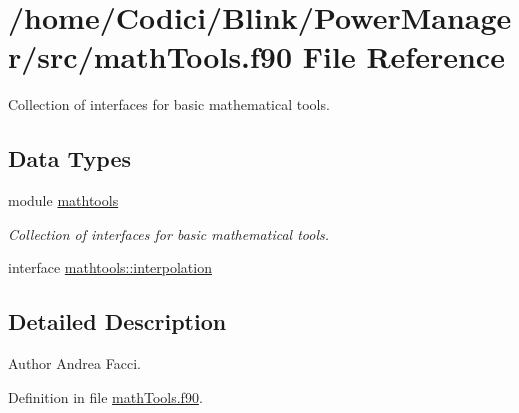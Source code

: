 \hypertarget{math_tools_8f90}{\section{/home/\-Codici/\-Blink/\-Power\-Manager/src/math\-Tools.f90 File Reference}
\label{math_tools_8f90}
}


Collection of interfaces for basic mathematical tools.  


\subsection*{Data Types}
\begin{DoxyCompactItemize}
\item 
module \hyperlink{classmathtools}{mathtools}
\begin{DoxyCompactList}\small\item\em Collection of interfaces for basic mathematical tools. \end{DoxyCompactList}\item 
interface \hyperlink{interfacemathtools_1_1interpolation}{mathtools\-::interpolation}
\end{DoxyCompactItemize}


\subsection{Detailed Description}
\begin{DoxyAuthor}{Author}
Andrea Facci. 
\end{DoxyAuthor}


Definition in file \hyperlink{math_tools_8f90_source}{math\-Tools.\-f90}.

